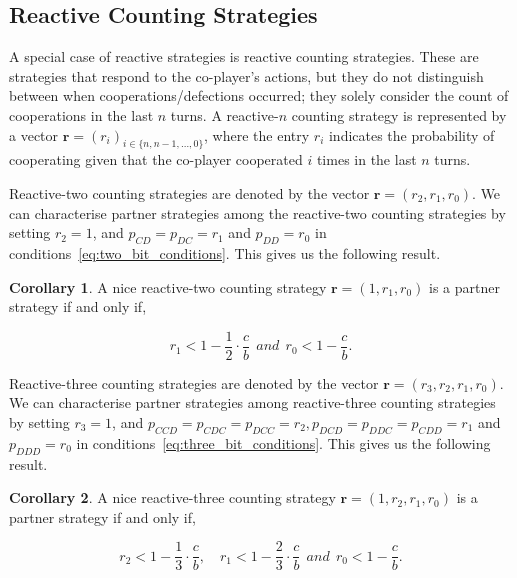 \documentclass{article}
\theoremstyle{definition}
\newtheorem{corollary}{Corollary}[theorem]
\begin{document}
\subsection{Reactive Counting Strategies}

A special case of reactive strategies is reactive counting strategies. These are
strategies that respond to the co-player's actions, but they do not distinguish
between when cooperations/defections occurred; they solely consider the count of
cooperations in the last $n$ turns. A reactive-$n$ counting strategy is represented
by a vector $\mathbf{r}=(r_i)_{i \in \{n, n -1, \dots, 0\}}$, where the entry \(r_i\)
indicates the probability of cooperating given that the co-player cooperated
\(i\) times in the last \(n\) turns.

Reactive-two counting strategies are denoted by the vector $\mathbf{r}=(r_2,
r_1, r_0)$. We can characterise partner strategies among the reactive-two
counting strategies by setting $r_2 = 1$, and $p_{CD} = p_{DC} = r_1$ and
$p_{DD} = r_0$ in conditions~\eqref{eq:two_bit_conditions}. This gives us the
following result.

\begin{corollary}
A nice reactive-two counting strategy $\mathbf{r} = (1, r_1, r_0)$ is a partner strategy if and only if,

\begin{equation}\label{eq:counting_two_bit_conditions}
  \displaystyle r_1 < 1-\frac{1}{2} \cdot \frac{c}{b} ~~and~~ r_0 < 1\!-\! \frac{c}{b}.
\end{equation}
\end{corollary}

Reactive-three counting strategies are denoted by the vector $\mathbf{r}=(r_3,
r_2, r_1, r_0)$. We can characterise partner strategies among reactive-three
counting strategies by setting $r_3 = 1$, and $p_{CCD} = p_{CDC} = p_{DCC} =
r_2, p_{DCD} = p_{DDC} = p_{CDD} = r_1$ and $p_{DDD} = r_0$ in
conditions~\eqref{eq:three_bit_conditions}. This gives us the following result.

\begin{corollary}
A nice reactive-three counting strategy $\mathbf{r} = (1, r_2, r_1, r_0)$ is a partner strategy if and only if,

\begin{equation}\label{eq:counting_three_bit_conditions}
  \displaystyle r_2 < 1- \frac{1}{3} \cdot \frac{c}{b}, \quad r_1 < 1- \frac{2}{3} \cdot \frac{c}{b} ~~and~~ r_0 < 1\!-\! \frac{c}{b}.
\end{equation}
\end{corollary}
\end{document}
